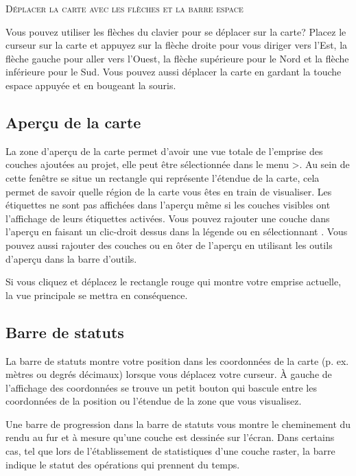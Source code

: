 \begin{Astuce}\caption{\textsc{Déplacer la carte avec les flèches et la barre espace}}
Vous pouvez utiliser les flèches du clavier pour se déplacer sur la carte? Placez le curseur sur la carte et appuyez sur la flèche droite pour vous diriger vers l'Est, la flèche gauche pour aller vers l'Ouest, la flèche supérieure pour le Nord et la flèche inférieure pour le Sud. Vous pouvez aussi déplacer la carte en gardant la touche espace appuyée et en bougeant la souris.
\end{Astuce}

\subsection{Aperçu de la carte}\label{label_mapoverview}

La zone d'aperçu de la carte permet d'avoir une vue totale de l'emprise des couches ajoutées au projet, elle peut être sélectionnée dans le menu >. Au sein de cette fenêtre se situe un rectangle qui représente l'étendue de la carte, cela permet de savoir quelle région de la carte vous êtes en train de visualiser. Les étiquettes ne sont pas affichées dans l'aperçu même si les couches visibles ont l'affichage de leurs étiquettes activées.
Vous pouvez rajouter une couche dans l'aperçu en faisant un clic-droit dessus dans la légende ou en sélectionnant . Vous pouvez aussi rajouter des couches ou en ôter de l'aperçu en utilisant les outils d'aperçu dans la barre d'outils.

Si vous cliquez et déplacez le rectangle rouge qui montre votre emprise actuelle, la vue principale se mettra en conséquence.

\subsection{Barre de statuts}\label{label_statusbar}

La barre de statuts montre votre position dans les coordonnées de la carte (p. ex. mètres ou degrés décimaux) lorsque vous déplacez votre curseur. À gauche de l'affichage des coordonnées se trouve un petit bouton qui bascule entre les coordonnées de la position ou l'étendue de la zone que vous visualisez.

Une barre de progression dans la barre de statuts vous montre le cheminement du rendu au fur et à mesure qu'une couche est dessinée sur l'écran. Dans certains cas, tel que lors de l'établissement de statistiques d'une couche raster, la barre indique le statut des opérations qui prennent du temps.


